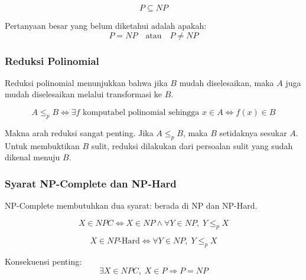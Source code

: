 \begin{equation}
    P\subseteq NP
    \label{eq:p-subset-np}
\end{equation}

Pertanyaan besar yang belum diketahui adalah apakah:
\begin{equation}
    P=NP \quad \text{atau} \quad P\ne NP
    \label{eq:p-versus-np}
\end{equation}

\subsubsection{Reduksi Polinomial}

\begin{jawab}
Reduksi polinomial menunjukkan bahwa jika $B$ mudah diselesaikan, maka $A$ juga mudah diselesaikan melalui transformasi ke $B$.
\end{jawab}

\begin{equation}
    A\le_p B
    \iff
    \exists f \text{ komputabel polinomial sehingga } x\in A \iff f(x)\in B
    \label{eq:poly-reduction}
\end{equation}

Makna arah reduksi sangat penting. Jika $A\le_p B$, maka $B$ setidaknya sesukar $A$. Untuk membuktikan $B$ sulit, reduksi dilakukan dari persoalan sulit yang sudah dikenal menuju $B$.

\subsubsection{Syarat NP-Complete dan NP-Hard}

\begin{jawab}
NP-Complete membutuhkan dua syarat: berada di NP dan NP-Hard.
\end{jawab}

\begin{equation}
    X\in NPC
    \iff
    X\in NP \land \forall Y\in NP,\;Y\le_p X
    \label{eq:npc-condition}
\end{equation}

\begin{equation}
    X\in NP\text{-Hard}
    \iff
    \forall Y\in NP,\;Y\le_p X
    \label{eq:np-hard-condition}
\end{equation}

Konsekuensi penting:
\begin{equation}
    \exists X\in NPC,\;X\in P \Rightarrow P=NP
    \label{eq:npc-in-p-consequence}
\end{equation}


